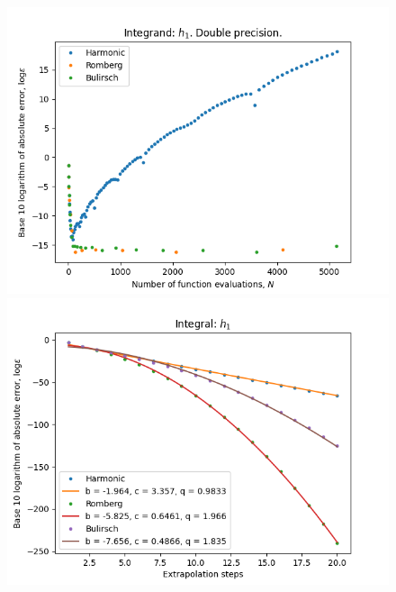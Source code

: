 \begin{figure}[H]
\centering
\begin{minipage}{0.45\textwidth}
\centering
\includegraphics[scale=0.45]{romberg_plots/h_one.png}
\end{minipage}
\begin{minipage}{0.45\textwidth}
\centering
\includegraphics[scale=0.45]{romberg_plots/h_one_hp_steps.png}
\end{minipage}
\end{figure}

